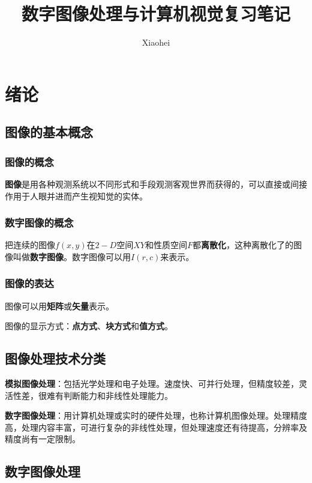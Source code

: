 \documentclass[cn, blue, normal, 12pt]{elegantnote}
\title{数字图像处理与计算机视觉复习笔记}
\author{Xiaohei}
\date{\zhtoday}
\begin{document}
\setlength{\lineskip}{0}
\setlength{\parskip}{0}

\maketitle

\section{绪论}

\subsection{图像的基本概念}

\subsubsection{图像的概念}

\textbf{图像}是用各种观测系统以不同形式和手段观测客观世界而获得的，可以直接或间接作用于人眼并进而产生视知觉的实体。

\subsubsection{数字图像的概念}

把连续的图像$f(x,y)$在$2-D$空间$XY$和性质空间$F$都\textbf{离散化}，这种离散化了的图像叫做\textbf{数字图像}。数字图像可以用$I(r,c)$来表示。

\subsubsection{图像的表达}

图像可以用\textbf{矩阵}或\textbf{矢量}表示。

图像的显示方式：\textbf{点方式}、\textbf{块方式}和\textbf{值方式}。

\subsection{图像处理技术分类}

\textbf{模拟图像处理}：包括光学处理和电子处理。速度快、可并行处理，但精度较差，灵活性差，很难有判断能力和非线性处理能力。

\textbf{数字图像处理}：用计算机处理或实时的硬件处理，也称计算机图像处理。处理精度高，处理内容丰富，可进行复杂的非线性处理，但处理速度还有待提高，分辨率及精度尚有一定限制。

\subsection{数字图像处理}
\end{document}

